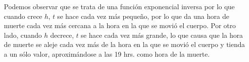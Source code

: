 Podemos observar que se trata de una función exponencial inversa por lo que cuando crece $h$, $t$ se hace cada vez más pequeño, por lo que da una hora de muerte cada vez más cercana a la hora en la que se movió el cuerpo. Por otro lado, cuando $h$ decrece, $t$ se hace cada vez más grande, lo que causa que la hora de muerte se aleje cada vez más de la hora en la que se movió el cuerpo y tienda a un sólo valor, aproximándose a las 19 hrs. como hora de la muerte.
